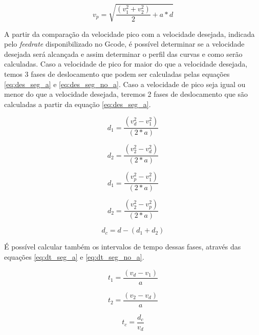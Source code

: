 \begin{equation}
    \label{eq:v_p}
    v_p = \sqrt{\frac{(v_1^2+v_2^2)}{2}+a*d}
\end{equation}

A partir da comparação da velocidade pico com a velocidade desejada, indicada pelo \textit{feedrate} disponibilizado no Gcode,
é possível determinar se a velocidade desejada será alcançada e assim determinar o perfil das curvas e como serão calculadas.
Caso a velocidade de pico for maior do que a velocidade desejada, temos 3 fases de deslocamento
que podem ser calculadas pelas equações \ref{eq:des_seg_a} e \ref{eq:des_seg_no_a}.
Caso a velocidade de pico seja igual ou menor do que a velocidade desejada, teremos 2 fases de deslocamento
que são calculadas a partir da equação \ref{eq:des_seg_a}.

\begin{equation}
    \label{eq:des_seg_a}
    d_1 = \frac{(v_d^2-v_1^2)}{(2*a)}
\end{equation}

\begin{equation}
    \label{eq:des_seg_a}
    d_2 = \frac{(v_2^2-v_d^2)}{(2*a)}
\end{equation}

\begin{equation}
    \label{eq:des_seg_a}
    d_1 = \frac{(v_p^2-v_1^2)}{(2*a)}
\end{equation}

\begin{equation}
    \label{eq:des_seg_a}
    d_2 = \frac{(v_2^2-v_p^2)}{(2*a)}
\end{equation}

\begin{equation}
    \label{eq:des_seg_no_a}
    d_c = d-(d_1+d_2)
\end{equation}

É possível calcular também os intervalos de tempo dessas fases, através das 
equações \ref{eq:dt_seg_a} e \ref{eq:dt_seg_no_a}.

\begin{equation}
    \label{eq:dt_seg_a}
    t_1 = \frac{(v_d-v_1)}{a}
\end{equation}

\begin{equation}
    \label{eq:dt_seg_a}
    t_2 = \frac{(v_2-v_d)}{a}
\end{equation}

\begin{equation}
    \label{eq:dt_seg_no_a}
    t_c = \frac{d_c}{v_d}
\end{equation}

